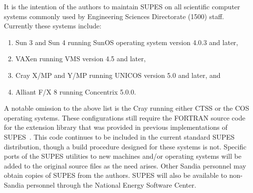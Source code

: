It is the intention of the authors to maintain SUPES on all scientific
computer systems commonly used by Engineering Sciences Directorate (1500)
staff.
Currently these systems include:
\begin{enumerate}
\item Sun 3 and Sun 4 running SunOS operating system version 4.0.3 and later,

\item VAXen running VMS version 4.5 and later,

\item Cray X/MP and Y/MP running UNICOS version 5.0 and later, and

\item Alliant F/X 8 running Concentrix 5.0.0.
\end{enumerate}
A notable omission to the above list is the Cray running either CTSS
or the COS operating systems.
These configurations still require the FORTRAN source code for the extension
library that was provided in previous
implementations of SUPES~\cite{SUPES}.
This code continues to be included in the current standard SUPES distribution,
though a build procedure designed for these systems is not.
Specific ports of the SUPES utilities to new machines and/or operating systems will be
added to the original source files as the need arises.
Other Sandia personnel may obtain copies of SUPES from the
authors.  SUPES will also be available to non-Sandia personnel through the
National Energy Software Center.
